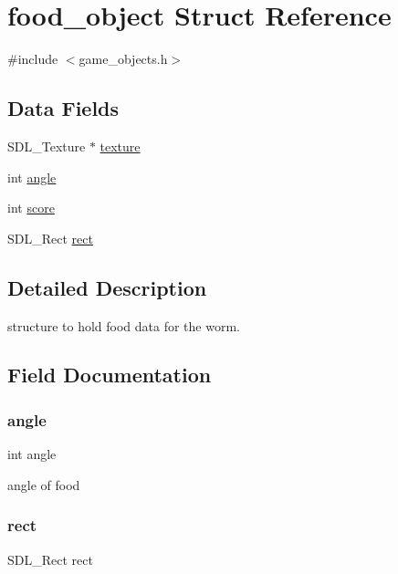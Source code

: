 \hypertarget{structfood__object}{}\section{food\+\_\+object Struct Reference}
\label{structfood__object}


{\ttfamily \#include $<$game\+\_\+objects.\+h$>$}

\subsection*{Data Fields}
\begin{DoxyCompactItemize}
\item 
S\+D\+L\+\_\+\+Texture $\ast$ \mbox{\hyperlink{structfood__object_a859b8efbf9abe8e82757ee5c75a0c97c}{texture}}
\item 
int \mbox{\hyperlink{structfood__object_a63177970cacb40efba67ce501ea89210}{angle}}
\item 
int \mbox{\hyperlink{structfood__object_aef160b7437d94056f1dc59646cd5b87d}{score}}
\item 
S\+D\+L\+\_\+\+Rect \mbox{\hyperlink{structfood__object_a55aefd071649ac9dd8133e2d8a52d11f}{rect}}
\end{DoxyCompactItemize}


\subsection{Detailed Description}
structure to hold food data for the worm. 

\subsection{Field Documentation}
\mbox{\label{structfood__object_a63177970cacb40efba67ce501ea89210}} 
\subsubsection{\texorpdfstring{angle}{angle}}
{\footnotesize\ttfamily int angle}

angle of food \mbox{\label{structfood__object_a55aefd071649ac9dd8133e2d8a52d11f}} 
\subsubsection{\texorpdfstring{rect}{rect}}
{\footnotesize\ttfamily S\+D\+L\+\_\+\+Rect rect}

